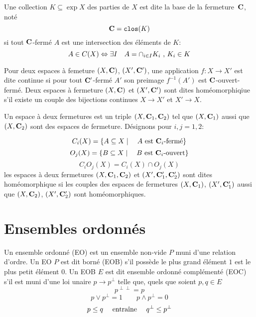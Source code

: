 Une collection $K\subseteq\exp X$ des parties de $X$ est dite la 
{\dff base de la fermeture}\ ${\bf C}$, not\'e  
\[ 
{\bf C} = {\tt clos}(K) 
\] 
si tout ${\bf C}$-ferm\'e $A$ est une intersection des \'el\'ements de $K$:  
\[ 
A\in C(X) \Leftrightarrow \exists I \quad A=\cap_{i\in I}K_i 
\hbox{ , }K_i\in K
\] 

Pour deux espaces \`a femeture $(X,{\bf C})$, $(X',{\bf C}')$, une 
application $f:X\to X'$ est dite {\dff continue} si pour tout 
${\bf C}'$-ferm\'e $A'$ son preimage $f^{-1}(A')$ est 
${\bf C}$-ouvert-ferm\'e.  Deux espaces \`a fermeture $(X,{\bf C})$ et 
$(X',{\bf C}')$ sont dites {\dff hom\'eomorphiqiue} s'il existe un 
couple des bijections continues $X\to X'$ et $X'\to X$. 

Un {\dff es\-p\-a\-ce \`a deux fer\-me\-tu\-res} est un tri\-ple 
$(X,{\bf C}_1,{\bf C}_2)$ tel que $(X,{\bf C}_1)$ aus\-si que $(X,{\bf C}_2)$ sont des 
es\-pa\-ces de fer\-me\-tu\-re. D\'e\-s\-i\-gn\-ons pour $i,j=1,2$:  

\[ C_i(X)=\{A\subseteq X\mid\quad A\hbox{ est 
}{\bf C}_i\hbox{-ferm\'e}\} \] 
\[ O_j(X)=\{B\subseteq X\mid\quad B\hbox{ 
est }{\bf C}_i\hbox{-ouvert}\} \] 
\[C_iO_j(X) = C_i(X)\cap O_j(X) 
\] les 
es\-pa\-ces \`a deux fer\-me\-tu\-res $(X,{\bf C}_1,{\bf C}_2)$ et 
$(X',{\bf C}_1',{\bf C}_2')$ sont dites {\dff ho\-m\'e\-o\-mor\-phi\-que} si 
les couples des es\-pa\-ces de fer\-me\-tu\-res $(X,{\bf C}_1)$, 
$(X',{\bf C}_1')$ aus\-si que $(X,{\bf C}_2)$, $(X',{\bf C}_2')$ sont 
ho\-m\'e\-o\-mor\-phi\-ques. 

\section{Ensembles ordonn\'es} 

Un ensemble ordonn\'e (EO) est un ensemble non-vide $P$ muni d'une 
relation d'ordre. Un EO $P$ est dit {\dff born\'e} (EOB) s'il 
poss\`ede le plus grand \'el\'ement $1$ est le plus petit 
\'el\'ement $0$. Un EOB $E$ est dit {\dff ensemble ordonn\'e 
compl\'ement\'e} (EOC) s'il est muni d'une loi unaire $p\to 
p^\perp$ telle que, quels que soient $p,q\in E$ 
\begin{equation} 
p^{\perp\perp}=p \label{invol} 
\end{equation} 
\begin{equation} 
p\lor p^\perp=1\qquad p\land 
p^\perp=0 \label{compl} 
\end{equation} 
\begin{equation} 
p\le q\quad\hbox{ entra\^\i ne }\quad 
q^\perp\le p^\perp \label{antiton} 
\end{equation} 

